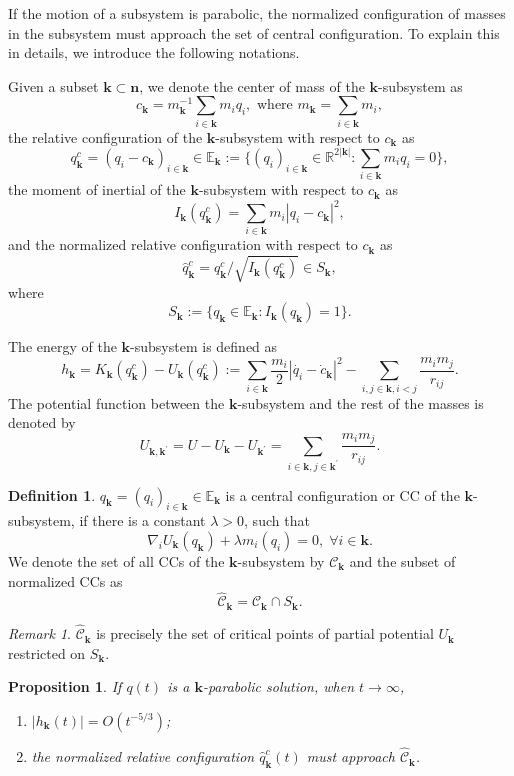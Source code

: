 \documentclass[11pt]{amsart}
\newtheorem{proposition}[theorem]{Proposition}
\theoremstyle{definition}
\newtheorem{definition}[theorem]{Definition}
\theoremstyle{remark}
\newtheorem{remark}[theorem]{Remark}
\numberwithin{equation}{section}
\newcommand{\rr}{\mathbb R}
\newcommand{\be}{\mathbb E}
\newcommand{\lmd}{\lambda}
\newcommand{\bn}{\mathbf n}
\newcommand{\bk}{\mathbf k}
\begin{document}
If the motion of a subsystem is parabolic, the normalized configuration of masses in the subsystem must approach the set of central configuration. To explain this in details, we introduce the following notations. 

Given a subset $\bk \subset \bn$, we denote the center of mass of the $\bk$-subsystem as
$$ c_{\bk} = m^{-1}_{\bk} \sum_{i \in \bk} m_i q_i, \text{ where } m_{\bk} = \sum_{i \in \bk} m_i,$$
the relative configuration of the $\bk$-subsystem with respect to $c_{\bk}$ as 
$$ q^c_{\bk}= (q_i - c_{\bk})_{i \in \bk} \in \be_{\bk} :=\{ (q_i)_{i \in \bk} \in \rr^{2 |\bk|}: \sum_{i \in \bk} m_i q_i =0\}, $$
the moment of inertial of the $\bk$-subsystem with respect to $c_{\bk}$ as 
$$ I_{\bk}(q^c_{\bk})= \sum_{i \in \bk} m_i|q_i - c_{\bk}|^2,$$
and the normalized relative configuration with respect to $c_{\bk}$ as
$$ \hat{q}^c_{\bk}  = q^c_{\bk}/ \sqrt{I_{\bk}(q^c_{\bk})}  \in S_{\bk}, $$
where 
$$ S_{\bk} := \{ q_{\bk} \in \be_{\bk}: I_{\bk}(q_{\bk})=1 \}.$$
 
The energy of the $\bk$-subsystem is defined as 
$$ h_\mathbf{k}=K_\mathbf{k}(q^c_{\bk})-U_\mathbf{k}(q^c_{\bk}) := \underset{i\in\mathbf{k}}{\sum}\frac{m_i}{2}|\dot{q_i}- \dot{c}_{\bk}|^2 -\underset{i,j\in\mathbf{k},i<j}{\sum}\frac{m_im_j}{r_{ij}}.$$
The potential function between the $\bk$-subsystem and the rest of the masses is denoted by
\begin{equation*}
    U_{\mathbf{k},\mathbf{k^\prime}}=U-U_{\mathbf{k}}-U_{\mathbf{k^\prime}}=\underset{i\in\mathbf{k},j\in\mathbf{k^\prime}}{\sum}\frac{m_im_j}{r_{ij}}. 
\end{equation*}


\begin{definition}
\label{df;cc} $q_{\bk} = (q_i)_{i \in \bk} \in \be_{\bk}$ is a central configuration or CC of the $\bk$-subsystem, if there is a constant $\lmd >0$, such that 
$$ \nabla_{i} U_{\bk}(q_{\bk}) + \lmd m_i (q_i) = 0, \; \forall i \in \bk.$$
We denote the set of all CCs of the $\bk$-subsystem by $\mathscr{C}_{\bk}$ and the subset of normalized CCs as 
$$ \hat{\mathscr{C}}_{\bk} = \mathscr{C}_{\bk} \cap S_{\bk}. $$
\end{definition}
\begin{remark}
	$\hat{\mathscr{C}}_{\bk}$ is precisely the set of critical points of partial potential $U_{\bk}$ restricted on $S_{\bk}$. 
\end{remark}

\begin{proposition}
\label{prop;para-energy} If $q(t)$ is a $\bk$-parabolic solution, when $t \to \infty$,
\begin{enumerate}
\item[(a).]  $|h_{\bk}(t)| = O(t^{-5/3})$;
\item[(b).]  the normalized relative configuration $\hat{q}^c_{\bk}(t)$ must approach $\hat{\mathscr{C}}_{\bk}$. 
\end{enumerate}
\end{proposition}
\end{document}
